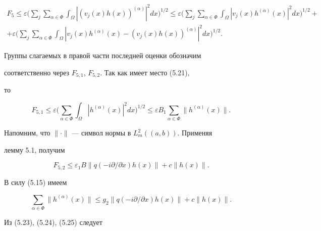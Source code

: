 \begin{multline*} 


F_5\le\varepsilon\bigg(\sum_j\sum_{\alpha\in\Phi}\int_\Omega 


|(v_j(x)h(x))^{(\alpha)}|^2dx\bigg)^{1/2}\le\varepsilon\bigg( 


\sum_j\sum_{\alpha\in\Phi}\int_\Omega|v_j(x)h^{(\alpha)}(x)|^2 


dx\bigg)^{1/2}+ \\ 


% 


+\varepsilon\bigg(\sum_j\sum_{\alpha\in\Phi}\int_\Omega 


|v_j(x)h^{(\alpha)}(x)-(v_j(x)h(x))^{(\alpha)}|^2dx\bigg)^{1/2}. 


\end{multline*} 


Группы слагаемых в правой части последней оценки обозначим 


соответственно через $F_{5,1}$, $F_{5,2}$. Так как имеет место (5.21), 


то 


\begin{equation} 


F_{5,1}\le\varepsilon\bigg(\sum_{\alpha\in\Phi}\int_\Omega 


|h^{(\alpha)}(x)|^2dx\bigg)^{1/2}\le\varepsilon B_1 


\sum_{\alpha\in\Phi}\|h^{(\alpha)}(x)\|. 


\end{equation} 


Напомним, что $\|\cdot\|$ --- символ нормы в $L^2_m((a,b))$. Применяя 


лемму 5.1, получим 


\begin{equation} 


F_{5,2}\le\varepsilon_1 B\|q(-i\partial/\partial x)h(x)\|+ 


c\|h(x)\|. 


\end{equation} 


В силу (5.15) имеем 


\begin{equation} 


\sum_{\alpha\in\Phi}\|h^{(\alpha)}(x)\|\le g_2 


\|q(-i\partial/\partial x)h(x)\|+c\|h(x)\|. 


\end{equation} 


Из (5.23), (5.24), (5.25) следует 


